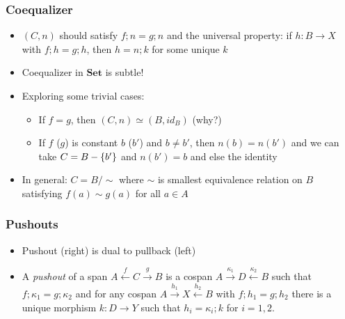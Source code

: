 \documentclass[handout]{beamer}
\newcommand{\bfsf}[1]{{\boldsymbol{#1}}}
\newcommand{\Set}{\bfsf{Set}}
\begin{document}
\frame
  {   
    \frametitle{Coequalizer}\label{Ch4:CoEqSet}

 \begin{itemize}[<+->]
\item $(C,n)$ should satisfy $f;n=g;n$ and the universal property:
if $h: B\to X$ with $f;h=g;h$, then $h=n;k$ for some unique $k$
\item Coequalizer in $\Set$ is subtle!
\item Exploring some trivial cases:
 \begin{itemize}
\item If $f=g$, then $(C,n)\simeq(B,id_B)$ (why?)
\item If $f$ ($g$) is constant $b$ ($b'$) and  $b\neq b'$, then $n(b)=n(b')$
and we can take $C = B-\{b'\}$ and $n(b')=b$ and else the identity
\end{itemize}
\item In general: $C=B/{\sim}$ where $\sim$ is smallest equivalence relation
 on $B$ satisfying $f(a)\sim g(a)$ for all $a\in A$
\end{itemize}

}

\frame
  {   
    \frametitle{Pushouts}\label{Ch4:Push}

 \begin{itemize}[<+->]
\item Pushout (right) is dual to pullback (left)
\item A \emph{pushout} of a span
$A\stackrel{f}{\leftarrow} C \stackrel{g}{\to}B$
is a cospan $A\stackrel{\kappa_1}{\to} D \stackrel{\kappa_2}{\leftarrow}B$ such that 
$f;\kappa_1=g;\kappa_2$ and for any cospan 
$A\stackrel{h_1}{\to} X \stackrel{h_2}{\leftarrow}B$
with $f;h_1 = g;h_2$
there is a unique morphism $k: D\to Y$
such that $h_i = \kappa_i;k$ for $i=1,2$.
 \end{itemize}

 }
\end{document}

